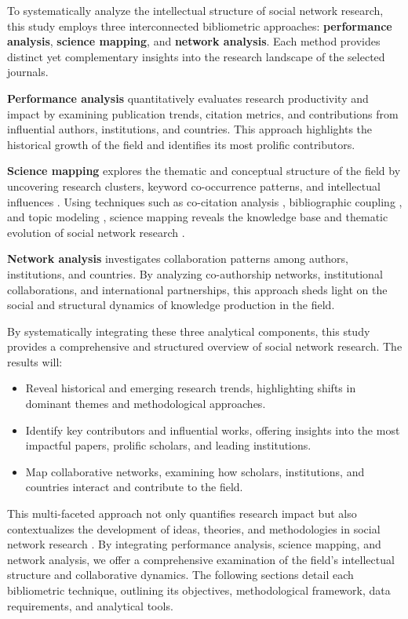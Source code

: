 \documentclass[twocolumn]{article}
\begin{document}
	To systematically analyze the intellectual structure of social network research, this study employs three interconnected bibliometric approaches: \textbf{performance analysis}, \textbf{science mapping}, and \textbf{network analysis}.\cite{bibid} Each method provides distinct yet complementary insights into the research landscape of the selected journals.
	
	\textbf{Performance analysis} quantitatively evaluates research productivity and impact by examining publication trends, citation metrics, and contributions from influential authors, institutions, and countries\cite{ WOS:000331771900008}. This approach highlights the historical growth of the field and identifies its most prolific contributors.
	
	\textbf{Science mapping} explores the thematic and conceptual structure of the field by uncovering research clusters, keyword co-occurrence patterns, and intellectual influences \cite{Small1973, Callon1991, Borner2003}. Using techniques such as co-citation analysis \cite{Small1973}, bibliographic coupling \cite{Kessler1963}, and topic modeling \cite{Blei2003}, science mapping reveals the knowledge base and thematic evolution of social network research \cite{Chen2006, Cobo2011}.
	
	\textbf{Network analysis} investigates collaboration patterns among authors, institutions, and countries. By analyzing co-authorship networks, institutional collaborations, and international partnerships, this approach sheds light on the social and structural dynamics of knowledge production in the field\cite{ WOS:000336729500129}.
	
	By systematically integrating these three analytical components, this study provides a comprehensive and structured overview of social network research\cite{donthu2021bibliometric,yazdanjue_comprehensive_2023}. The results will:
	\begin{itemize}
		\item Reveal historical and emerging research trends, highlighting shifts in dominant themes and methodological approaches.
		\item Identify key contributors and influential works, offering insights into the most impactful papers, prolific scholars, and leading institutions.
		\item Map collaborative networks, examining how scholars, institutions, and countries interact and contribute to the field.
	\end{itemize}
	This multi-faceted approach not only quantifies research impact but also contextualizes the development of ideas, theories, and methodologies in social network research \cite{Small1973, Callon1991, Cobo2011}. By integrating performance analysis, science mapping, and network analysis, we offer a comprehensive examination of the field’s intellectual structure and collaborative dynamics. The following sections detail each bibliometric technique, outlining its objectives, methodological framework, data requirements, and analytical tools.
	
\end{document}
